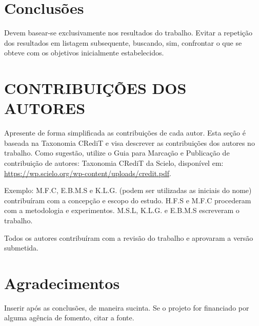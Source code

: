 \section*{Conclusões}

Devem basear-se exclusivamente nos resultados do trabalho. Evitar a repetição dos resultados em listagem subsequente, buscando, sim, confrontar o que se obteve com os objetivos inicialmente estabelecidos.

\section*{CONTRIBUIÇÕES DOS AUTORES}
Apresente de forma simplificada as contribuições de cada autor. Esta seção é baseada na Taxonomia CRediT e visa descrever as contribuições dos autores no trabalho. Como sugestão, utilize o Guia para Marcação e Publicação de contribuição de autores: Taxonomia CRediT da Scielo, disponível em: \url{https://wp.scielo.org/wp-content/uploads/credit.pdf}.

Exemplo: M.F.C, E.B.M.S e K.L.G. (podem ser utilizadas as iniciais do nome) contribuíram com a concepção e escopo do estudo. H.F.S e M.F.C procederam com a metodologia e experimentos. M.S.L, K.L.G. e E.B.M.S escreveram o trabalho.

Todos os autores contribuíram com a revisão do trabalho e aprovaram a versão submetida.


\section*{Agradecimentos}

Inserir após as conclusões, de maneira sucinta. Se o projeto for financiado por alguma agência de fomento, citar a fonte.